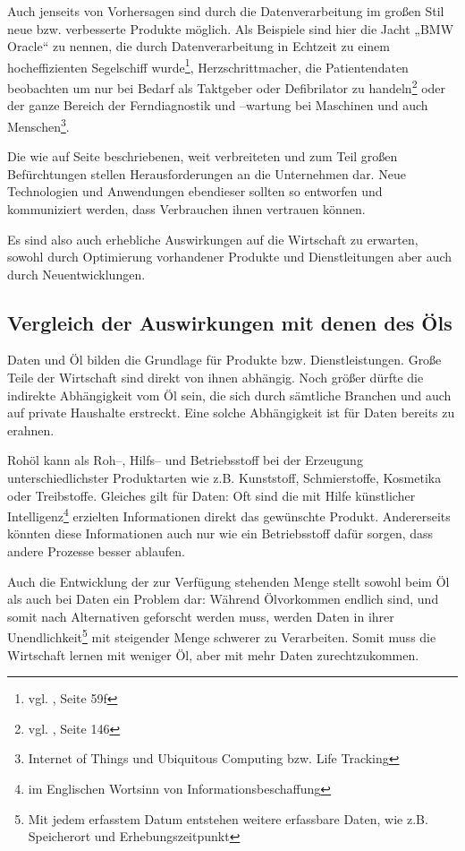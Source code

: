 Auch jenseits von Vorhersagen sind durch die Datenverarbeitung im großen Stil neue bzw. verbesserte Produkte möglich. Als Beispiele sind hier die Jacht „BMW Oracle“ zu nennen, die durch Datenverarbeitung in Echtzeit zu einem hocheffizienten Segelschiff wurde\footnote{vgl. \cite{laudon}, Seite 59f}, Herzschrittmacher, die Patientendaten beobachten um nur bei Bedarf als Taktgeber oder Defibrilator zu handeln\footnote{vgl. \cite{froeling}, Seite 146} oder der ganze Bereich der Ferndiagnostik und --wartung bei Maschinen und auch Menschen\footnote{Internet of Things und Ubiquitous Computing bzw. Life Tracking}.

Die wie auf Seite \pageref{probleme} beschriebenen, weit verbreiteten und zum Teil großen Befürchtungen stellen Herausforderungen an die Unternehmen dar. Neue Technologien und Anwendungen ebendieser sollten so entworfen und kommuniziert werden, dass Verbrauchen ihnen vertrauen können.

Es sind also auch erhebliche Auswirkungen auf die Wirtschaft zu erwarten, sowohl durch Optimierung vorhandener Produkte und Dienstleitungen aber auch durch Neuentwicklungen.

\subsection{Vergleich der Auswirkungen mit denen des Öls}
\label{vergleich}

Daten und Öl bilden die Grundlage für Produkte bzw. Dienstleistungen. Große Teile der Wirtschaft sind direkt von ihnen abhängig. Noch größer dürfte die indirekte Abhängigkeit vom Öl sein, die sich durch sämtliche Branchen und auch auf private Haushalte erstreckt. Eine solche Abhängigkeit ist für Daten bereits zu erahnen.

Rohöl kann als Roh--, Hilfs-- und Betriebsstoff bei der Erzeugung unterschiedlichster Produktarten wie z.B. Kunststoff, Schmierstoffe, Kosmetika oder Treibstoffe. Gleiches gilt für Daten: Oft sind die mit Hilfe künstlicher Intelligenz\footnote{im Englischen Wortsinn von Informationsbeschaffung} erzielten Informationen direkt das gewünschte Produkt. Andererseits könnten diese Informationen auch nur wie ein Betriebsstoff dafür sorgen, dass andere Prozesse besser ablaufen.

Auch die Entwicklung der zur Verfügung stehenden Menge stellt sowohl beim Öl als auch bei Daten ein Problem dar: Während Ölvorkommen endlich sind, und somit nach Alternativen geforscht werden muss, werden Daten in ihrer Unendlichkeit\footnote{Mit jedem erfasstem Datum entstehen weitere erfassbare Daten, wie z.B. Speicherort und Erhebungszeitpunkt} mit steigender Menge schwerer zu Verarbeiten. Somit muss die Wirtschaft lernen mit weniger Öl, aber mit mehr Daten zurechtzukommen.

